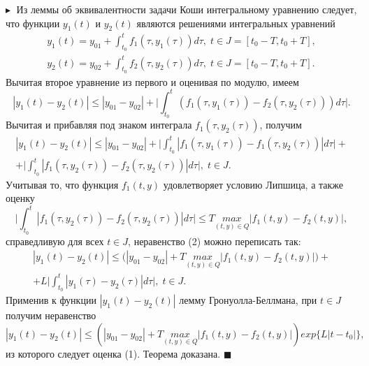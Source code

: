 $\blacktriangleright\;$ Из леммы об эквивалентности задачи Коши интегральному уравнению следует, что функции $y_1(t)$ и $y_2(t)$ являются решениями интегральных уравнений
\begin{equation*}
\begin{split}
y_1(t)=y_{01}+\int_{t_0}^t f_1(\tau , y_1(\tau))d\tau , \;t\in J =[t_0-T, t_0+T],\\
y_2(t)=y_{02}+\int_{t_0}^t f_2(\tau , y_2(\tau))d\tau , \;t\in J = [t_0-T, t_0+T].
\end{split}
\end{equation*}
Вычитая второе уравнение из первого и оценивая по модулю, имеем
\begin{equation*}
|y_1(t)-y_2(t)|\leq |y_{01}-y_{02}|+\big| \int_{t_0}^t (f_1(\tau , y_1(\tau))- f_2(\tau , y_2(\tau)))d\tau \big|.
\end{equation*}
Вычитая и прибавляя под знаком интеграла $f_1(\tau,y_2(\tau))$, получим
\begin{equation*}\tag{2}
\begin{split}
|y_1(t)-y_2(t)|\leq |y_{01}-y_{02}|+\big| \int_{t_0}^t |f_1(\tau , y_1(\tau))- f_1(\tau , y_2(\tau))|d\tau \big| +\\
+\big| \int_{t_0}^t |f_1(\tau , y_2(\tau))- f_2(\tau , y_2(\tau))|d\tau \big|,\; t\in J.    
\end{split}
\end{equation*}
Учитывая то, что функция $f_1(t,y)$ удовлетворяет условию Липшица, а также оценку
\begin{equation*}
\big| \int_{t_0}^t |f_1(\tau , y_2(\tau))- f_2(\tau , y_2(\tau))|d\tau \big|\leq T \underset{(t,y)\in Q}{max} |f_1(t,y)-f_2(t,y)|,
\end{equation*}
справедливую для всех $t\in J$, неравенство (2) можно переписать так:
\begin{equation*}
\begin{split}
|y_1(t)-y_2(t)|\leq \big( |y_{01}-y_{02}|+  T \underset{(t,y)\in Q}{max} |f_1(t,y)-f_2(t,y)|\big)+\\
+L \big| \int_{t_0}^t |y_1(\tau)- y_2(\tau)|d\tau \big|, \;t\in J.
\end{split}
\end{equation*}
Применив к функции $|y_1(t)-y_2(t)|$ лемму Гронуолла-Беллмана, при $t\in J$ получим неравенство
\begin{equation*}
|y_1(t)-y_2(t)|\leq (|y_{01}-y_{02}|+  T \underset{(t,y)\in Q}{max} |f_1(t,y)-f_2(t,y)|) exp\{L|t-t_0|\},
\end{equation*}
из которого следует оценка (1). Теорема доказана. $\blacksquare$

